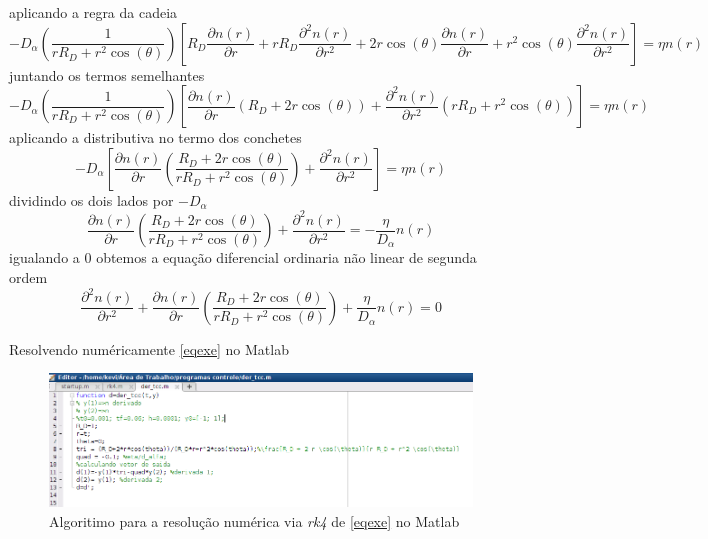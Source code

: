 \documentclass[12pt,oneside,a4paper]{abntex2}
\begin{document}
aplicando a regra da cadeia
\begin{equation*}
-D_\alpha \left( \frac{1}{r R_D + r^2 \cos(\theta)} \right)  \left[ R_D \dfrac{\partial n(r)}{\partial r} + r R_D \dfrac{\partial^2 n(r)}{\partial r^2} + 2 r \cos(\theta)\dfrac{\partial n(r)}{\partial r} + r^2 \cos(\theta)\dfrac{\partial^2 n(r)}{\partial r^2}  \right] =\eta n(r)
\end{equation*}
juntando os termos semelhantes
\begin{equation*}
-D_\alpha \left( \frac{1}{r R_D + r^2 \cos(\theta)} \right)  \left[ \dfrac{\partial n(r)}{\partial r} (R_D + 2 r \cos(\theta)) + \dfrac{\partial^2 n(r)}{\partial r^2} (r R_D + r^2 \cos(\theta)) \right] =\eta n(r)
\end{equation*}
aplicando a distributiva no termo dos conchetes
\begin{equation*}
-D_\alpha \left[ \dfrac{\partial n(r)}{\partial r} \left( \frac{R_D + 2 r \cos(\theta)}{r R_D + r^2 \cos(\theta)} \right)+ \dfrac{\partial^2 n(r)}{\partial r^2} \right] =\eta n(r)
\end{equation*}
dividindo os dois lados por $-D_\alpha$
\begin{equation*}
\dfrac{\partial n(r)}{\partial r} \left( \frac{R_D + 2 r \cos(\theta)}{r R_D + r^2 \cos(\theta)} \right)+ \dfrac{\partial^2 n(r)}{\partial r^2} =-\frac{\eta}{D_\alpha} n(r)
\end{equation*}
igualando a $0$ obtemos a equação diferencial ordinaria não linear de segunda ordem
\begin{equation}
\label{eqexe}
\dfrac{\partial^2 n(r)}{\partial r^2} + \dfrac{\partial n(r)}{\partial r} \left( \frac{R_D + 2 r \cos(\theta)}{r R_D + r^2 \cos(\theta)} \right)+ \frac{\eta}{D_\alpha} n(r) = 0
\end{equation}

Resolvendo numéricamente \ref{eqexe} no Matlab
\begin{figure}[H]
\centering
\includegraphics[scale=0.4]{exeplo.png} 
\caption{Algoritimo para a resolução numérica via \textit{rk4} de \ref{eqexe} no Matlab}
\end{figure}
\end{document}
